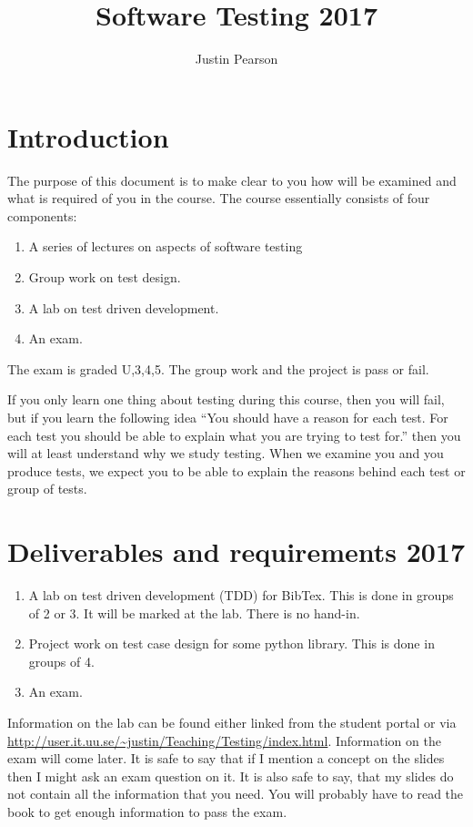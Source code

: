 \documentclass[a4page]{article}
\title{Software Testing 2017}
\author{Justin Pearson}
\begin{document}
\maketitle


\section{Introduction}
The purpose of this document is to make clear to you how will be examined and
what is required of you in the course.  The course essentially consists of
four components:
\begin{enumerate}
\item A series of lectures on aspects of software testing
\item Group work on test design.
\item A lab on test driven development.
\item An exam.
\end{enumerate}
The exam is graded U,3,4,5. The group work and the project is pass or fail.

If you only learn one thing about testing during this course, then you will
fail, but if you learn the following idea ``You should have a reason for each
test. For each test you should be able to explain what you are trying to test
for.'' then you will at least understand why we study testing. When we examine
you and you produce tests, we expect you to be able to explain the reasons
behind each test or group of tests.


\section{Deliverables and requirements  2017}



\begin{enumerate}
\item A lab on  test driven development (TDD) for  BibTex.   This is
  done in groups of 2 or 3. It will be marked at the lab. There is no
  hand-in. 


\item Project work on test case design for some python library. This
  is done in groups of 4.
\item An exam.

  \end{enumerate}


  Information on the lab can be found either linked from the student portal or
  via
  \url{http://user.it.uu.se/~justin/Teaching/Testing/index.html}. Information
  on the exam will come later. It is safe to say that if I mention a concept
  on the slides then I might ask an exam question on it. It is also safe to
  say, that my slides do not contain all the information that you need. You
  will probably have to read the book to get enough information to pass the
  exam.
\end{document}
